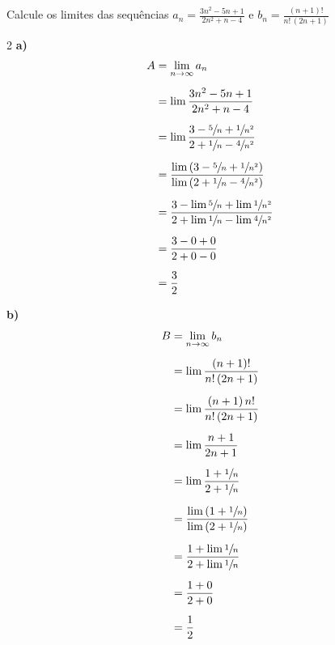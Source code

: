 \documentclass[a4paper,12pt,fleqn]{article}
\begin{document}
Calcule os limites das sequências
\(
  a_n = \frac{3n^2-5n+1}{2n^2+n-4}
\)
\quad e \quad
\(
  b_n = \frac{(n+1)!}{n!\,(2n+1)}
\)

\begin{answer}
\begin{multicols}{2}
\textbf{a)}
\begin{align*}
  A
  & = \lim_{n\to\infty} a_n   \\[2mm]
  & = \lim \frac{3n^2-5n+1}{2n^2+n-4}  \\[2mm]
  & = \lim \frac{3-\sfrac{5}{n}+\sfrac{1}{n^2}}
                {2+\sfrac{1}{n}-\sfrac{4}{n^2}} \\[2mm]
  & = \frac{\lim \left(3-\sfrac{5}{n}+\sfrac{1}{n^2}\right)}
           {\lim \left(2+\sfrac{1}{n}-\sfrac{4}{n^2}\right)}  \\[2mm]
  & = \frac{3-\lim \sfrac{5}{n}+\lim \sfrac{1}{n^2}}
           {2+\lim \sfrac{1}{n}-\lim \sfrac{4}{n^2}} \\[2mm]
  & = \frac{3-0+0}{2+0-0} \\[2mm]
  & =  \frac{3}{2}
\end{align*}

\columnbreak

\textbf{b)}
\begin{align*}
  B
  & = \lim_{n\to\infty} b_n  \\[2mm]
  & = \lim \frac{(n+1)!}{n!\,(2n+1)} \\[2mm]
  & = \lim \frac{(n+1)\,n!}{n!\,(2n+1)} \\[2mm]
  & = \lim \frac{n+1}{2n+1} \\[2mm]
  & = \lim \frac{1+\sfrac{1}{n}}{2+\sfrac{1}{n}} \\[2mm]
  & = \frac{\lim \left(1+\sfrac{1}{n}\right)}
           {\lim \left(2+\sfrac{1}{n}\right)} \\[2mm]
 & = \frac{1+\lim \sfrac{1}{n}}
          {2+\lim \sfrac{1}{n}} \\[2mm]
 & = \frac{1+0}
          {2+0} \\[2mm]
 & = \frac{1}{2}
\end{align*}
\end{multicols}
\end{answer}

\end{document}
